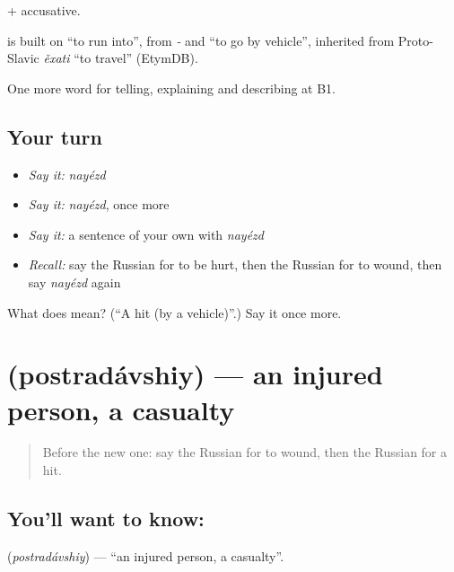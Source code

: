 \emph{ } + accusative.

\begin{cousinweb}
\emph{} is built on \emph{} \textquotedblleft{}to run into\textquotedblright{}, from \emph{-} and \emph{} \textquotedblleft{}to go by vehicle\textquotedblright{}, inherited from Proto-Slavic \emph{ěxati} \textquotedblleft{}to travel\textquotedblright{} (EtymDB).
\end{cousinweb}

\begin{grammarlens}[title={What you've built}]
One more word for telling, explaining and describing at B1.
\end{grammarlens}

\subsection*{Your turn}
\begin{itemize}
\raggedright
  \item \emph{Say it:} \emph{nayézd}
  \item \emph{Say it:} \emph{nayézd}, once more
  \item \emph{Say it:} a sentence of your own with \emph{nayézd}
  \item \emph{Recall:} say the Russian for to be hurt, then the Russian for to wound, then say \emph{nayézd} again
\end{itemize}

\begin{tcolorbox}[breakable,colback=teal!4,colframe=teal!35!black,title={Before you move on}]
What does  mean? (\textquotedblleft{}A hit (by a vehicle)\textquotedblright{}.) Say it once more.
\end{tcolorbox}
\section[\texorpdfstring{\ru{пострадавший} (postradávshiy)}{пострадавший (postradávshiy)}]{ (postradávshiy) — an injured person, a casualty}

\label{lesson:RU-C298-postradavshiy}



\begin{quote}
Before the new one: say the Russian for to wound, then the Russian for a hit.
\end{quote}

\subsection*{You'll want to know: }
\textbf{} (\emph{postradávshiy}) — \textquotedblleft{}an injured person, a casualty\textquotedblright{}.


